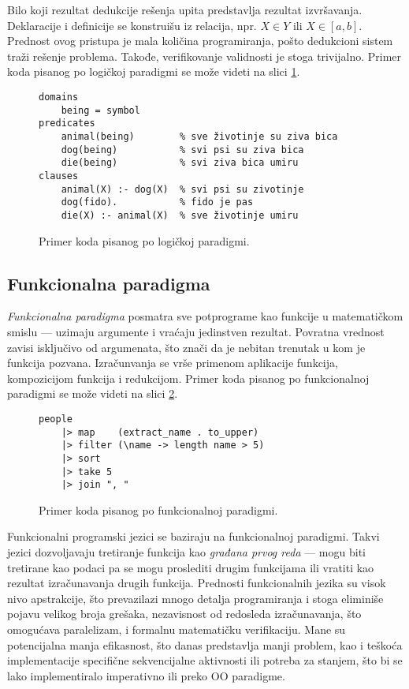 Bilo koji rezultat dedukcije rešenja upita predstavlja rezultat izvršavanja. Deklaracije i definicije se konstruišu iz relacija, npr. $X \in Y$ ili $X \in [a,b]$. Prednost ovog pristupa je mala količina programiranja, pošto dedukcioni sistem traži rešenje problema. Takođe, verifikovanje validnosti je stoga trivijalno. Primer koda pisanog po logičkoj paradigmi se može videti na slici \ref{fig:ParadigmLogical}.

\begin{figure}[h!]
\begin{lstlisting}
domains
    being = symbol 
predicates
    animal(being)        % sve životinje su ziva bica
    dog(being)           % svi psi su ziva bica
    die(being)           % svi ziva bica umiru 
clauses
    animal(X) :- dog(X)  % svi psi su zivotinje
    dog(fido).           % fido je pas
    die(X) :- animal(X)  % sve životinje umiru 
\end{lstlisting}
\caption{Primer koda pisanog po logičkoj paradigmi.}
\label{fig:ParadigmLogical}
\end{figure}


\subsection{Funkcionalna paradigma}
\label{subsec:ParadigmFunctional}

\emph{Funkcionalna paradigma} posmatra sve potprograme kao funkcije u matematičkom smislu --- uzimaju argumente i vraćaju jedinstven rezultat. Povratna vrednost zavisi isključivo od argumenata, što znači da je nebitan trenutak u kom je funkcija pozvana. Izračunvanja se vrše primenom aplikacije funkcija, kompozicijom funkcija i redukcijom. Primer koda pisanog po funkcionalnoj paradigmi se može videti na slici \ref{fig:ParadigmFunctional}.

\begin{figure}[h!]
\begin{lstlisting}
people 
    |> map    (extract_name . to_upper) 
    |> filter (\name -> length name > 5) 
    |> sort
    |> take 5
    |> join ", "
\end{lstlisting}
\caption{Primer koda pisanog po funkcionalnoj paradigmi.}
\label{fig:ParadigmFunctional}
\end{figure}
    
Funkcionalni programski jezici se baziraju na funkcionalnoj paradigmi. Takvi jezici dozvoljavaju tretiranje funkcija kao \emph{građana prvog reda} --- mogu biti tretirane kao podaci pa se mogu proslediti drugim funkcijama ili vratiti kao rezultat izračunavanja drugih funkcija. Prednosti funkcionalnih jezika su visok nivo apstrakcije, što prevazilazi mnogo detalja programiranja i stoga eliminiše pojavu velikog broja grešaka, nezavisnost od redosleda izračunavanja, što omogućava paralelizam, i formalnu matematičku verifikaciju. Mane su potencijalna manja efikasnost, što danas predstavlja manji problem, kao i teškoća implementacije specifične sekvencijalne aktivnosti ili potreba za stanjem, što bi se lako implementiralo imperativno ili preko OO paradigme.


